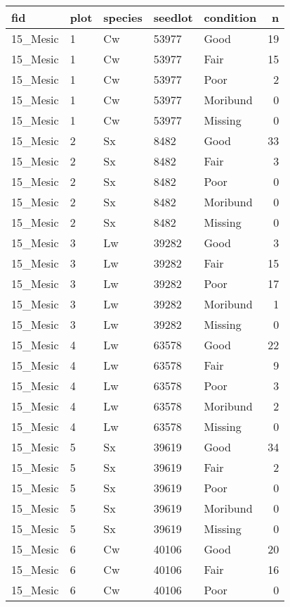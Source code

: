 \documentclass[
]{article}
\begin{document}
\begin{tabular}{l|l|l|l|l|r}
\hline
fid & plot & species & seedlot & condition & n\\
\hline
15\_Mesic & 1 & Cw & 53977 & Good & 19\\
\hline
15\_Mesic & 1 & Cw & 53977 & Fair & 15\\
\hline
15\_Mesic & 1 & Cw & 53977 & Poor & 2\\
\hline
15\_Mesic & 1 & Cw & 53977 & Moribund & 0\\
\hline
15\_Mesic & 1 & Cw & 53977 & Missing & 0\\
\hline
15\_Mesic & 2 & Sx & 8482 & Good & 33\\
\hline
15\_Mesic & 2 & Sx & 8482 & Fair & 3\\
\hline
15\_Mesic & 2 & Sx & 8482 & Poor & 0\\
\hline
15\_Mesic & 2 & Sx & 8482 & Moribund & 0\\
\hline
15\_Mesic & 2 & Sx & 8482 & Missing & 0\\
\hline
15\_Mesic & 3 & Lw & 39282 & Good & 3\\
\hline
15\_Mesic & 3 & Lw & 39282 & Fair & 15\\
\hline
15\_Mesic & 3 & Lw & 39282 & Poor & 17\\
\hline
15\_Mesic & 3 & Lw & 39282 & Moribund & 1\\
\hline
15\_Mesic & 3 & Lw & 39282 & Missing & 0\\
\hline
15\_Mesic & 4 & Lw & 63578 & Good & 22\\
\hline
15\_Mesic & 4 & Lw & 63578 & Fair & 9\\
\hline
15\_Mesic & 4 & Lw & 63578 & Poor & 3\\
\hline
15\_Mesic & 4 & Lw & 63578 & Moribund & 2\\
\hline
15\_Mesic & 4 & Lw & 63578 & Missing & 0\\
\hline
15\_Mesic & 5 & Sx & 39619 & Good & 34\\
\hline
15\_Mesic & 5 & Sx & 39619 & Fair & 2\\
\hline
15\_Mesic & 5 & Sx & 39619 & Poor & 0\\
\hline
15\_Mesic & 5 & Sx & 39619 & Moribund & 0\\
\hline
15\_Mesic & 5 & Sx & 39619 & Missing & 0\\
\hline
15\_Mesic & 6 & Cw & 40106 & Good & 20\\
\hline
15\_Mesic & 6 & Cw & 40106 & Fair & 16\\
\hline
15\_Mesic & 6 & Cw & 40106 & Poor & 0\\

\end{tabular}
\end{document}
